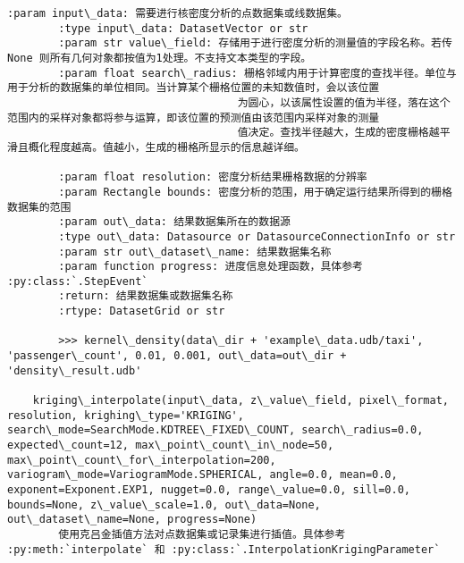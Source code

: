 \documentclass[11pt]{article}
\begin{document}
\begin{Verbatim}[commandchars=\\\{\}]
        :param input\_data: 需要进行核密度分析的点数据集或线数据集。
        :type input\_data: DatasetVector or str
        :param str value\_field: 存储用于进行密度分析的测量值的字段名称。若传 None 则所有几何对象都按值为1处理。不支持文本类型的字段。
        :param float search\_radius: 栅格邻域内用于计算密度的查找半径。单位与用于分析的数据集的单位相同。当计算某个栅格位置的未知数值时，会以该位置
                                    为圆心，以该属性设置的值为半径，落在这个范围内的采样对象都将参与运算，即该位置的预测值由该范围内采样对象的测量
                                    值决定。查找半径越大，生成的密度栅格越平滑且概化程度越高。值越小，生成的栅格所显示的信息越详细。
        
        :param float resolution: 密度分析结果栅格数据的分辨率
        :param Rectangle bounds: 密度分析的范围，用于确定运行结果所得到的栅格数据集的范围
        :param out\_data: 结果数据集所在的数据源
        :type out\_data: Datasource or DatasourceConnectionInfo or str
        :param str out\_dataset\_name: 结果数据集名称
        :param function progress: 进度信息处理函数，具体参考 :py:class:`.StepEvent`
        :return: 结果数据集或数据集名称
        :rtype: DatasetGrid or str
        
        >>> kernel\_density(data\_dir + 'example\_data.udb/taxi', 'passenger\_count', 0.01, 0.001, out\_data=out\_dir + 'density\_result.udb'
    
    kriging\_interpolate(input\_data, z\_value\_field, pixel\_format, resolution, krighing\_type='KRIGING', search\_mode=SearchMode.KDTREE\_FIXED\_COUNT, search\_radius=0.0, expected\_count=12, max\_point\_count\_in\_node=50, max\_point\_count\_for\_interpolation=200, variogram\_mode=VariogramMode.SPHERICAL, angle=0.0, mean=0.0, exponent=Exponent.EXP1, nugget=0.0, range\_value=0.0, sill=0.0, bounds=None, z\_value\_scale=1.0, out\_data=None, out\_dataset\_name=None, progress=None)
        使用克吕金插值方法对点数据集或记录集进行插值。具体参考 :py:meth:`interpolate` 和 :py:class:`.InterpolationKrigingParameter`
        

\end{Verbatim}
\end{document}
